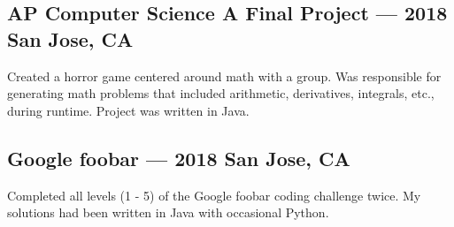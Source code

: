 \documentclass[letterpaper,12pt]{article}
\begin{document}
	\subsection{AP Computer Science A Final Project --- 2018 \null\hfill San Jose, CA}
	\par Created a horror game centered around math with a group. Was responsible for generating math problems that included arithmetic, derivatives, integrals, etc., during runtime. Project was written in Java.
	\subsection{Google foobar --- 2018 \null\hfill San Jose, CA}
	\par Completed all levels (1 - 5) of the Google foobar coding challenge twice.
	My solutions had been written in Java with occasional Python.
\end{document}
